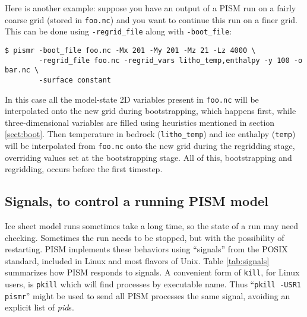 Here is another example: suppose you have an output of a PISM run on a fairly
coarse grid (stored in \texttt{foo.nc}) and you want to continue this run on a
finer grid. This can be done using \texttt{-regrid_file} along with
\texttt{-boot_file}:
\begin{verbatim}
$ pismr -boot_file foo.nc -Mx 201 -My 201 -Mz 21 -Lz 4000 \
        -regrid_file foo.nc -regrid_vars litho_temp,enthalpy -y 100 -o bar.nc \
        -surface constant
\end{verbatim}
In this case all the model-state 2D variables present in \texttt{foo.nc} will
be interpolated onto the new grid during bootstrapping, which happens first,
while three-dimensional variables are filled using heuristics mentioned in
section \ref{sect:boot}.  Then temperature in bedrock (\texttt{litho_temp}) and
ice enthalpy (\texttt{temp}) will be interpolated from \texttt{foo.nc} onto the
new grid during the regridding stage, overriding values set at the
bootstrapping stage.  All of this, bootstrapping and regridding, occurs before
the first timestep.


\newcommand\pid{\textsl{pid}s}

\subsection{Signals, to control a running PISM model} \label{subsect:signal}    Ice sheet model runs sometimes take a long time, so the state of a run may need checking.  Sometimes the run needs to be stopped, but with the possibility of restarting.  PISM implements these behaviors using ``signals'' from the POSIX standard, included in Linux and most flavors of Unix.  Table \ref{tab:signals} summarizes how PISM responds to signals.  A convenient form of \texttt{kill}, for Linux users, is \texttt{pkill} which will find processes by executable name.  Thus ``\texttt{pkill -USR1 pismr}'' might be used to send all PISM processes the same signal, avoiding an explicit list of \pid.

